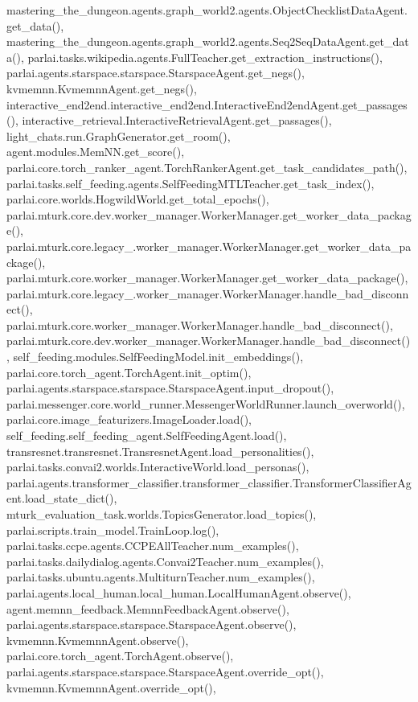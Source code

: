 mastering\+\_\+the\+\_\+dungeon.\+agents.\+graph\+\_\+world2.\+agents.\+Object\+Checklist\+Data\+Agent.\+get\+\_\+data(), mastering\+\_\+the\+\_\+dungeon.\+agents.\+graph\+\_\+world2.\+agents.\+Seq2\+Seq\+Data\+Agent.\+get\+\_\+data(), parlai.\+tasks.\+wikipedia.\+agents.\+Full\+Teacher.\+get\+\_\+extraction\+\_\+instructions(), parlai.\+agents.\+starspace.\+starspace.\+Starspace\+Agent.\+get\+\_\+negs(), kvmemnn.\+Kvmemnn\+Agent.\+get\+\_\+negs(), interactive\+\_\+end2end.\+interactive\+\_\+end2end.\+Interactive\+End2end\+Agent.\+get\+\_\+passages(), interactive\+\_\+retrieval.\+Interactive\+Retrieval\+Agent.\+get\+\_\+passages(), light\+\_\+chats.\+run.\+Graph\+Generator.\+get\+\_\+room(), agent.\+modules.\+Mem\+N\+N.\+get\+\_\+score(), parlai.\+core.\+torch\+\_\+ranker\+\_\+agent.\+Torch\+Ranker\+Agent.\+get\+\_\+task\+\_\+candidates\+\_\+path(), parlai.\+tasks.\+self\+\_\+feeding.\+agents.\+Self\+Feeding\+M\+T\+L\+Teacher.\+get\+\_\+task\+\_\+index(), parlai.\+core.\+worlds.\+Hogwild\+World.\+get\+\_\+total\+\_\+epochs(), parlai.\+mturk.\+core.\+dev.\+worker\+\_\+manager.\+Worker\+Manager.\+get\+\_\+worker\+\_\+data\+\_\+package(), parlai.\+mturk.\+core.\+legacy\+\_.\+worker\+\_\+manager.\+Worker\+Manager.\+get\+\_\+worker\+\_\+data\+\_\+package(), parlai.\+mturk.\+core.\+worker\+\_\+manager.\+Worker\+Manager.\+get\+\_\+worker\+\_\+data\+\_\+package(), parlai.\+mturk.\+core.\+legacy\+\_.\+worker\+\_\+manager.\+Worker\+Manager.\+handle\+\_\+bad\+\_\+disconnect(), parlai.\+mturk.\+core.\+worker\+\_\+manager.\+Worker\+Manager.\+handle\+\_\+bad\+\_\+disconnect(), parlai.\+mturk.\+core.\+dev.\+worker\+\_\+manager.\+Worker\+Manager.\+handle\+\_\+bad\+\_\+disconnect(), self\+\_\+feeding.\+modules.\+Self\+Feeding\+Model.\+init\+\_\+embeddings(), parlai.\+core.\+torch\+\_\+agent.\+Torch\+Agent.\+init\+\_\+optim(), parlai.\+agents.\+starspace.\+starspace.\+Starspace\+Agent.\+input\+\_\+dropout(), parlai.\+messenger.\+core.\+world\+\_\+runner.\+Messenger\+World\+Runner.\+launch\+\_\+overworld(), parlai.\+core.\+image\+\_\+featurizers.\+Image\+Loader.\+load(), self\+\_\+feeding.\+self\+\_\+feeding\+\_\+agent.\+Self\+Feeding\+Agent.\+load(), transresnet.\+transresnet.\+Transresnet\+Agent.\+load\+\_\+personalities(), parlai.\+tasks.\+convai2.\+worlds.\+Interactive\+World.\+load\+\_\+personas(), parlai.\+agents.\+transformer\+\_\+classifier.\+transformer\+\_\+classifier.\+Transformer\+Classifier\+Agent.\+load\+\_\+state\+\_\+dict(), mturk\+\_\+evaluation\+\_\+task.\+worlds.\+Topics\+Generator.\+load\+\_\+topics(), parlai.\+scripts.\+train\+\_\+model.\+Train\+Loop.\+log(), parlai.\+tasks.\+ccpe.\+agents.\+C\+C\+P\+E\+All\+Teacher.\+num\+\_\+examples(), parlai.\+tasks.\+dailydialog.\+agents.\+Convai2\+Teacher.\+num\+\_\+examples(), parlai.\+tasks.\+ubuntu.\+agents.\+Multiturn\+Teacher.\+num\+\_\+examples(), parlai.\+agents.\+local\+\_\+human.\+local\+\_\+human.\+Local\+Human\+Agent.\+observe(), agent.\+memnn\+\_\+feedback.\+Memnn\+Feedback\+Agent.\+observe(), parlai.\+agents.\+starspace.\+starspace.\+Starspace\+Agent.\+observe(), kvmemnn.\+Kvmemnn\+Agent.\+observe(), parlai.\+core.\+torch\+\_\+agent.\+Torch\+Agent.\+observe(), parlai.\+agents.\+starspace.\+starspace.\+Starspace\+Agent.\+override\+\_\+opt(), kvmemnn.\+Kvmemnn\+Agent.\+override\+\_\+opt(), 